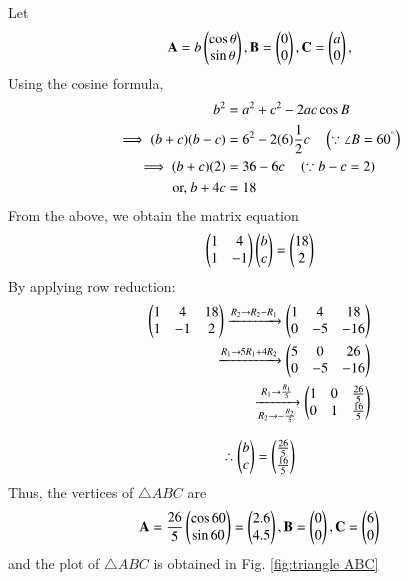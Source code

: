 
Let
\begin{align}
\mathbf{A} = b\begin{pmatrix}\cos \theta\\  \sin \theta\end{pmatrix} ,\mathbf{B} = \begin{pmatrix}0\\0\end{pmatrix},\mathbf{C} = \begin{pmatrix}a\\0\end{pmatrix},
\end{align}
Using the cosine formula, 
\begin{align}
b^2 &= a^2 + c^2 - 2ac \cos B
\\
\implies (b+c)(b-c) &=6^2 - 2(6)\frac{1}{2}c \quad \left(\because \angle B = 60^{\degree}\right)
\\
\implies (b+c)(2)&=36-6c \quad \left(\because b-c = 2\right)
\\
\text{or, } b+4c &=18
\end{align}
From the above, we obtain the matrix equation
\begin{align}
\begin{pmatrix}1 & 4\\1& -1\end{pmatrix}\begin{pmatrix}b\\c\end{pmatrix} = \begin{pmatrix}18\\2\end{pmatrix}
\end{align}
By applying row reduction:
\begin{align}
\begin{pmatrix}
1 & 4  & 18 
\\
1 & -1   & 2 
\end{pmatrix}
  \xrightarrow{R_2\rightarrow R_2-R_1}
\begin{pmatrix}
1 & 4  & 18
\\
0 & -5   & -16 
\end{pmatrix} 
\\
  \xrightarrow{R_1\rightarrow 5R_1+4R_2} 
\begin{pmatrix}
5 & 0   & 26 
\\
0 & -5  & -16 
\end{pmatrix}
\\
 \xrightarrow[R_2 \rightarrow -\frac{R_2}{5}]{R_1\rightarrow \frac{R_1}{5}} 
\begin{pmatrix}
1 & 0   & \frac{26}{5} 
\\
0 & 1   & \frac{16}{5}
\end{pmatrix}
\end{align}

\begin{align}
\therefore    \begin{pmatrix}b\\c\end{pmatrix}=\begin{pmatrix}\frac{26}{5}\\\frac{16}{5}\end{pmatrix}
\end{align}
Thus, the vertices of $\triangle ABC$ are 
\begin{align}
    \mathbf{A}=\frac{26}{5}\begin{pmatrix}\cos60\\\sin60\end{pmatrix}=\begin{pmatrix}2.6\\4.5\end{pmatrix} ,\mathbf{B}=\begin{pmatrix}0\\0\end{pmatrix},\mathbf{C}=\begin{pmatrix}6\\0\end{pmatrix}
\end{align}
and the plot of   $\triangle ABC$ is obtained in Fig. \ref{fig:triangle ABC}

